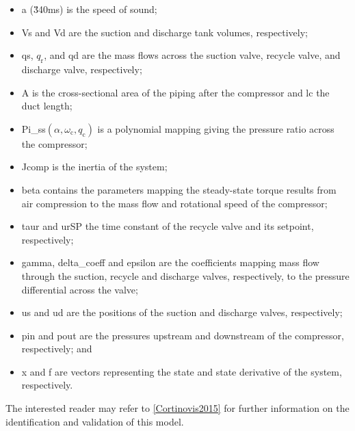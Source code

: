 \begin{itemize}[noitemsep]
  \item \gls{a} (\u{340}{m\per s}) is the speed of sound;
  \item \gls{Vs} and \gls{Vd} are the suction and discharge tank volumes, respectively;
  \item \gls{qs}, $q_\text{r}$, and \gls{qd} are the mass flows across the suction valve, recycle valve, and discharge valve, respectively;
  \item \gls{A} is the cross-sectional area of the piping after the compressor and \gls{lc} the duct length;
  \item \gls{Pi_ss}$\left(\alpha,\omega_\text{c}, q_\text{c} \right)$ is a polynomial mapping giving the pressure ratio across the compressor;
  \item \gls{Jcomp} is the inertia of the system;
  \item \gls{beta} contains the parameters mapping the steady-state torque results from air compression to the mass flow and rotational speed of the compressor;
  \item \gls{taur} and \gls{urSP} the time constant of the recycle valve and its setpoint, respectively;
  \item \gls{gamma}, \gls{delta_coeff} and \gls{epsilon} are the coefficients mapping mass flow through the suction, recycle and discharge valves, respectively, to the pressure differential across the valve;
  \item \gls{us} and \gls{ud} are the positions of the suction and discharge valves, respectively;
  \item \gls{pin} and \gls{pout} are the pressures upstream and downstream of the compressor, respectively; and
  \item \gls{x} and \gls{f} are vectors representing the state and state derivative of the system, respectively.
\end{itemize}

The interested reader may refer to \ref{Cortinovis2015} for further information on the identification and validation of this model.



